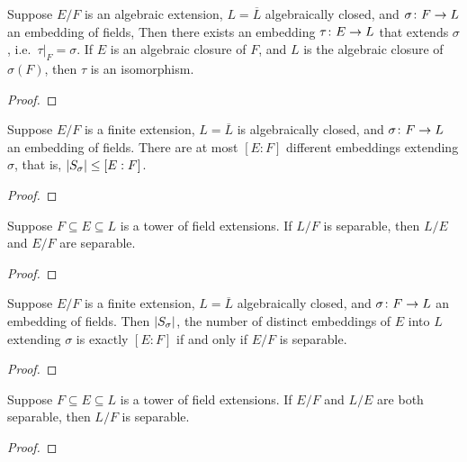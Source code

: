 \begin{proposition}
    Suppose \(E/F\) is an algebraic extension,
    \(L = \overline{L}\) algebraically closed,
    and \(\sigma\colon F\to L\) an embedding of fields,
    Then there exists an embedding \(\tau\colon E\to L\) that extends \(\sigma\),
    i.e.\ \(\tau\vert_F = \sigma\).
    If \(E\) is an algebraic closure of \(F\),
    and \(L\) is the algebraic closure of \(\sigma(F)\),
    then \(\tau\) is an isomorphism.
\end{proposition}
\begin{proof}
\end{proof}
\begin{proposition}
    Suppose \(E/F\) is a finite extension,
    \(L = \overline{L}\) is algebraically closed,
    and \(\sigma\colon F\to L\) an embedding of fields.
    There are at most \([E:F]\) different embeddings extending \(\sigma\),
    that is, \(\abs{S_\sigma} \leq [E:F]\).
\end{proposition}
\begin{proof}
\end{proof}
\begin{proposition}
    Suppose \(F \subseteq E \subseteq L\) is a tower of field extensions.
    If \(L/F\) is separable, then \(L/E\) and \(E/F\) are separable.
\end{proposition}
\begin{proof}
\end{proof}
\begin{theorem}
    Suppose \(E/F\) is a finite extension,
    \(L = \overline{L}\) algebraically closed,
    and \(\sigma\colon F\to L\) an embedding of fields.
    Then \(\abs{S_\sigma}\),
    the number of distinct embeddings of \(E\) into \(L\) extending \(\sigma\)
    is exactly \([E:F]\) if and only if \(E/F\) is separable.
\end{theorem}
\begin{proof}
\end{proof}

\begin{theorem}
    Suppose \(F \subseteq E \subseteq L\) is a tower of field extensions.
    If \(E/F\) and \(L/E\) are both separable,
    then \(L/F\) is separable.
\end{theorem}
\begin{proof}
\end{proof}

